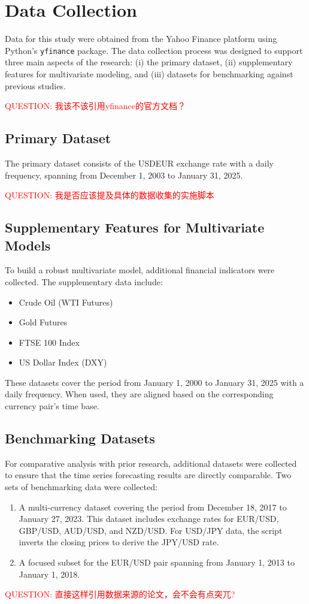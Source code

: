 \section{Data Collection}

Data for this study were obtained from the Yahoo Finance platform using Python’s \texttt{yfinance} package.
The data collection process was designed to support three main aspects of the research: (i) the primary dataset, (ii) supplementary features for multivariate modeling, and (iii) datasets for benchmarking against previous studies.

\textcolor{red}{QUESTION: 我该不该引用yfinance的官方文档？}
\subsection{Primary Dataset}
The primary dataset consists of the USDEUR exchange rate with a daily frequency, spanning from December 1, 2003 to January 31, 2025.

\textcolor{red}{QUESTION: 我是否应该提及具体的数据收集的实施脚本}


\subsection{Supplementary Features for Multivariate Models}
To build a robust multivariate model, additional financial indicators were collected.
The supplementary data include:
\begin{itemize}
    \item Crude Oil (WTI Futures)
    \item Gold Futures
    \item FTSE 100 Index
    \item US Dollar Index (DXY)
\end{itemize}
These datasets cover the period from January 1, 2000 to January 31, 2025 with a daily frequency.
When used, they are aligned based on the corresponding currency pair's time base.


\subsection{Benchmarking Datasets}
For comparative analysis with prior research, additional datasets were collected to ensure that the time series forecasting results are directly comparable. Two sets of benchmarking data were collected:
\begin{enumerate}
    \item A multi-currency dataset covering the period from December 18, 2017 to January 27, 2023. This dataset includes exchange rates for EUR/USD, GBP/USD, AUD/USD, and NZD/USD. For USD/JPY data, the script inverts the closing prices to derive the JPY/USD rate\cite{Garcia2023ComparisonRegression}.
    \item A focused subset for the EUR/USD pair spanning from January 1, 2013 to January 1, 2018\cite{Yildirim2021ComparisonClassification}.
\end{enumerate}

\textcolor{red}{QUESTION: 直接这样引用数据来源的论文，会不会有点突兀?}
